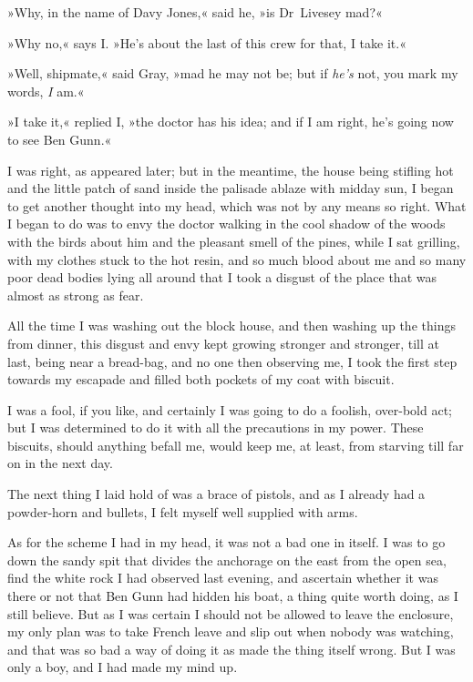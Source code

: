 »Why, in the name of Davy Jones,« said he, »is Dr~Livesey mad?«

»Why no,« says I. »He's about the last of this crew for that, I take it.«

»Well, shipmate,« said Gray, »mad he may not be; but if \textit{he's} not, you mark my words, \textit{I} am.«

»I take it,« replied I, »the doctor has his idea; and if I am right, he's going now to see Ben Gunn.«

I was right, as appeared later; but in the meantime, the house being stifling hot and the little patch of sand inside the palisade ablaze with midday sun, I began to get another thought into my head, which was not by any means so right. What I began to do was to envy the doctor walking in the cool shadow of the woods with the birds about him and the pleasant smell of the pines, while I sat grilling, with my clothes stuck to the hot resin, and so much blood about me and so many poor dead bodies lying all around that I took a disgust of the place that was almost as strong as fear.

All the time I was washing out the block house, and then washing up the things from dinner, this disgust and envy kept growing stronger and stronger, till at last, being near a bread-bag, and no one then observing me, I took the first step towards my escapade and filled both pockets of my coat with biscuit.

I was a fool, if you like, and certainly I was going to do a foolish, over-bold act; but I was determined to do it with all the precautions in my power. These biscuits, should anything befall me, would keep me, at least, from starving till far on in the next day.

The next thing I laid hold of was a brace of pistols, and as I already had a powder-horn and bullets, I felt myself well supplied with arms.

As for the scheme I had in my head, it was not a bad one in itself. I was to go down the sandy spit that divides the anchorage on the east from the open sea, find the white rock I had observed last evening, and ascertain whether it was there or not that Ben Gunn had hidden his boat, a thing quite worth doing, as I still believe. But as I was certain I should not be allowed to leave the enclosure, my only plan was to take French leave and slip out when nobody was watching, and that was so bad a way of doing it as made the thing itself wrong. But I was only a boy, and I had made my mind up.

